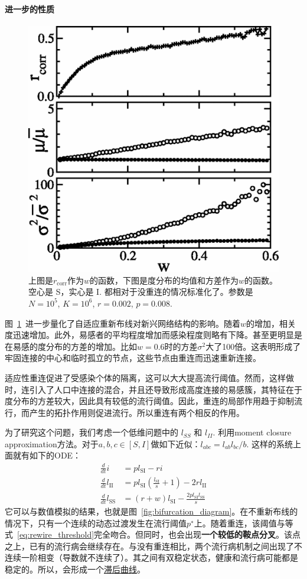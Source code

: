 \paragraph{进一步的性质}
\begin{figure}
    \centering
    \includegraphics[width = 0.5\linewidth]{Pics/Degree_correlation_index.png}
    \caption{上图是$r_\text{corr}$作为$w$的函数，下图是度分布的均值和方差作为$w$的函数。空心是 S，实心是 I. 都相对于没重连的情况标准化了。参数是$N=10^5$, $K = 10^6$, $r = 0.002$, $p = 0.008$.}\label{fig:parameters_vs_rewire}
\end{figure}

图~\ref{fig:parameters_vs_rewire}~进一步量化了自适应重新布线对新兴网络结构的影响。随着$w$的增加，相关度迅速增加。此外，易感者的平均程度增加而感染程度则略有下降。甚至更明显是在易感的度分布的方差的增加。比如$w=0.6$时的方差$\sigma^2$大了100倍。这表明形成了牢固连接的中心和临时孤立的节点，这些节点由重连而迅速重新连接。

适应性重连促进了受感染个体的隔离，这可以大大提高流行阈值。然而，这样做时，连引入了人口中连接的混合，并且还导致形成高度连接的易感簇，其特征在于度分布的方差较大，因此具有较低的流行阈值。因此，重连的局部作用趋于抑制流行，而产生的拓扑作用则促进流行。所以重连有两个相反的作用。

为了研究这个问题，我们考虑一个低维问题中的 $l_{SS}$ 和 $l_{II}$. 利用moment closure approximation方法。对于$a,b,c\in[S,I]$做如下近似：$l_{abc} = l_{ab} l_{bc} / b$. 这样的系统上面就有如下的ODE：
\begin{align}
    \frac{d}{d t} i&=p l_{\mathrm{SI}}-r i\\
    \frac{d}{d t} l_{\mathrm{II}}&=p l_{\mathrm{SI}}\left(\frac{l_{\mathrm{SI}}}{s}+1\right)-2 r l_{\mathrm{II}}\\
    \frac{d}{d t} l_{\mathrm{SS}}&=(r+w) l_{\mathrm{SI}}-\frac{2 p l_{\mathrm{SI}} l_{\mathrm{SS}}}{s}
\end{align}
它可以与数值模拟的结果，也就是图~\ref{fig:bifurcation_diagram}。在不重新布线的情况下，只有一个连续的动态过渡发生在流行阈值$p^∗$上。随着重连，该阈值与等式~\ref{eq:rewire_threshold}完全吻合。但同时，也会出现\textbf{一个较低的鞍点分叉}。该点之上，已有的流行病会继续存在。与没有重连相比，两个流行病机制之间出现了不连续一阶相变（导数就不连续了）。其之间有双稳定状态，健康和流行病可能都是稳定的。所以，会形成一个\href{https://baike.baidu.com/item/滞后回线/360581?fr=aladdin}{滞后曲线}。

